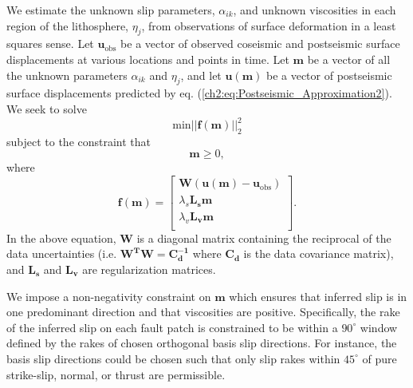 We estimate the unknown slip parameters, $\alpha_{ik}$, and unknown
viscosities in each region of the lithosphere, $\eta_j$, from
observations of surface deformation in a least squares sense. Let
$\mathbf{u_{\mathrm{obs}}}$ be a vector of observed coseismic and
postseismic surface displacements at various locations and points in
time.  Let $\mathbf{m}$ be a vector of all the unknown parameters
$\alpha_{ik}$ and $\eta_j$, and let $\mathbf{u(m)}$ be a vector of
postseismic surface displacements predicted by eq.
(\ref{ch2:eq:Postseismic_Approximation2}). We seek to solve
\begin{equation}\label{ch2:eq:Inverse_Problem}
\mathrm{min} \big|\big|\mathbf{f(m)}\big|\big|_2^2
\end{equation}
subject to the constraint that
\begin{equation}
\mathbf{m}\geq0,
\end{equation}
where 
\begin{equation}\label{ch2:eq:ResidualFunction}
\mathbf{f(m)} = 
\left[\begin{array}{c}
  \mathbf{W\left(u(m)-u_{\mathrm{obs}}\right)}\\
  \lambda_s\mathbf{L_sm}\\
  \lambda_v\mathbf{L_vm}\\
\end{array}\right].
\end{equation}  
In the above equation, $\mathbf{W}$ is a diagonal matrix containing
the reciprocal of the data uncertainties (i.e. $\mathbf{W^TW} =
\mathbf{C_d^{-1}}$ where $\mathbf{C_d}$ is the data covariance
matrix), and $\mathbf{L_s}$ and $\mathbf{L_v}$ are regularization
matrices.

We impose a non-negativity constraint on $\mathbf{m}$ which ensures that
inferred slip is in one predominant direction and that viscosities are
positive.  Specifically, the rake of the inferred slip on each fault
patch is constrained to be within a $90^\circ$ window defined by the
rakes of chosen orthogonal basis slip directions. For instance, the
basis slip directions could be chosen such that only slip rakes within
$45^\circ$ of pure strike-slip, normal, or thrust are permissible.

